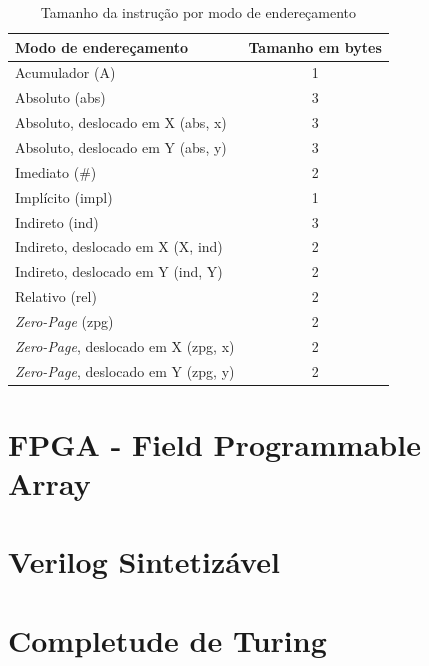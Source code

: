 \documentclass[
	12pt,				  %
	openright,		%
	a4paper,			%
	english,			%
	french,				%
	spanish,			%
	brazil,				%
]{abntex2}
\begin{document}
\begin{table}[htb]
	\centering
	\ABNTEXfontereduzida
	\caption{Tamanho da instrução por modo de endereçamento} \label{tab:Instr3OP}
	\begin{tabular}{l|c}
		\textbf{Modo de endereçamento}            & \textbf{Tamanho em bytes} \\ \hline
		Acumulador (A)                            & 1                         \\ \hline
		Absoluto (abs)                            & 3                         \\ \hline
		Absoluto, deslocado em X (abs, x)         & 3                         \\ \hline
		Absoluto, deslocado em Y (abs, y)         & 3                         \\ \hline
		Imediato (\#)                             & 2                         \\ \hline
		Implícito (impl)                          & 1                         \\ \hline
		Indireto (ind)                            & 3                         \\ \hline
		Indireto, deslocado em X (X, ind)         & 2                         \\ \hline
		Indireto, deslocado em Y (ind, Y)         & 2                         \\ \hline
		Relativo (rel)                            & 2                         \\ \hline
		\emph{Zero-Page} (zpg)                    & 2                         \\ \hline
		\emph{Zero-Page}, deslocado em X (zpg, x) & 2                         \\ \hline
		\emph{Zero-Page}, deslocado em Y (zpg, y) & 2                         \\ \hline
	\end{tabular}
\end{table}


\section{FPGA - Field Programmable Array}

\section{Verilog Sintetizável}

\section{Completude de Turing}
\end{document}
